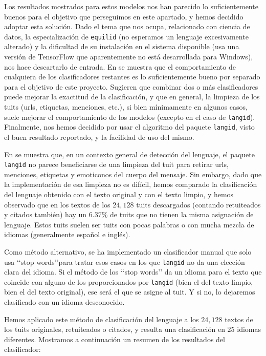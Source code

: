 Los resultados mostrados para estos modelos nos han parecido lo suficientemente
buenos para el objetivo que perseguimos en este apartado, y hemos decidido adoptar esta solución.
Dado el tema que nos ocupa, relacionado con ciencia de datos, la especialización 
de {\tt equilid} (no esperamos un lenguaje excesivamente alterado) 
y la dificultad de su instalación en el sistema disponible
(usa una versión de TensorFlow que aparentemente no está desarrollada para Windows),
nos hace descartarlo de entrada. 
En \cite{langid2} se muestra que el comportamiento de cualquiera de los clasificadores 
restantes es lo suficientemente bueno por
separado para el objetivo de este proyecto. Sugieren que combinar dos o más clasificadores
puede mejorar la exactitud de la clasificación, y que en general, la limpieza de
los tuits (urls, etiquetas, menciones, etc.), si bien mínimamente en algunos casos,
suele mejorar el comportamiento de los modelos (excepto en el caso de {\tt langid}). 
Finalmente, nos hemos decidido por usar el algoritmo del paquete {\tt langid}, visto
el buen resultado reportado, y la facilidad de uso del mismo. 

En \cite{langid2} se muestra que, en un contexto general de detección del lenguaje, 
el paquete {\tt langid} no parece beneficiarse de una limpieza del tuit
para retirar urls, menciones, etiquetas y emoticonos del cuerpo del mensaje.
Sin embargo, dado que la implementación de esa limpieza no 
es difícil, hemos comparado la clasificación del lenguaje obtenido
con el texto original y con el texto limpio, y hemos observado que en los
textos de los $24,128$ tuits descargados (contando retuiteados y citados también)
hay un $6.37$\% de tuits que no tienen la misma asignación de lenguaje. 
Estos tuits suelen ser tuits con pocas palabras
o con mucha mezcla de idiomas (generalmente español e inglés).

Como método alternativo, se ha implementado un clasificador manual que solo
usa \lq\lq stop words\rq\rq para tratar esos casos en los que {\tt langid}
no da una elección clara del idioma. Si el método de los \lq\lq stop words\rq\rq
da un idioma para el texto que coincide con alguno de los proporcionados por 
{\tt langid} (bien el del texto limpio, bien el del texto original), ese será
el que se asigne al tuit. Y si no, lo dejaremos clasificado con un idioma desconocido.

Hemos aplicado este método de clasificación del lenguaje a los $24,128$ textos
de los tuits originales, retuiteados o citados, y resulta una clasificación en $25$
idiomas diferentes. Mostramos a continuación un resumen de los resultados del clasificador:


